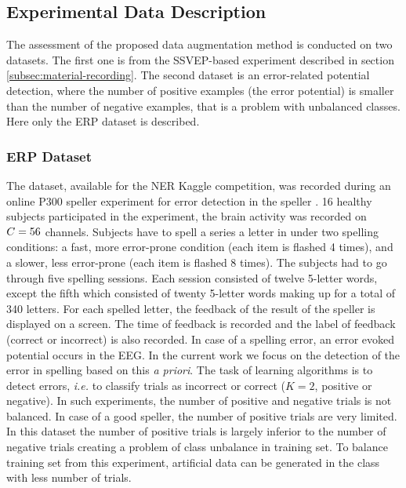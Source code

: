 \subsection{Experimental Data Description}
\label{sec:data}

The assessment of the proposed data augmentation method is conducted on two datasets.
The first one is from the SSVEP-based experiment described in section \ref{subsec:material-recording}.
The second dataset is an error-related potential detection, where the number of positive examples (the error potential) is smaller than the number of negative examples, that is a problem with unbalanced classes.
Here only the ERP dataset is described.

\subsubsection{ERP Dataset}
The dataset, available for the NER Kaggle competition, was recorded during an online P300 speller experiment for error detection in the speller \cite{margaux_objective_2012}.
16 healthy subjects participated in the experiment, the brain activity was recorded on $C=56$ channels. 
Subjects have to spell a series a letter in under two spelling conditions: a fast, more error-prone condition (each item is flashed 4 times), and a slower, less error-prone (each item is flashed 8 times). 
The subjects had to go through five spelling sessions. 
Each session consisted of twelve 5-letter words, except the fifth which consisted of twenty 5-letter words making up for a total of 340 letters. 
For each spelled letter, the feedback of the result of the speller is displayed on a screen.
The time of feedback is recorded and the label of feedback (correct or incorrect) is also recorded. 
In case of a spelling error, an error evoked potential occurs in the EEG. 
In the current work we focus on the detection of the error in spelling based on this \emph{a priori}. 
The task of learning algorithms is to detect errors, \textit{i.e.} to classify trials as incorrect or correct ($K=2$, positive or negative). 
In such experiments, the number of positive and negative trials is not balanced. 
In case of a good speller, the number of positive trials are very limited. 
In this dataset the number of positive trials is largely inferior to the number of negative trials creating a problem of class unbalance in training set.
To balance training set from this experiment, artificial data can be generated in the class with less number of trials.

